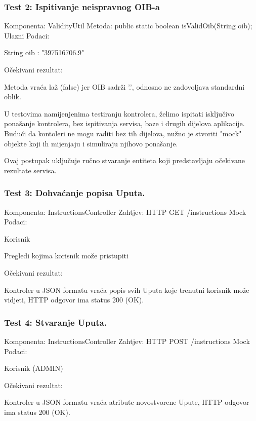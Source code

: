 			\subsubsection*{Test 2: Ispitivanje neispravnog OIB-a}
			Komponenta: ValidityUtil \newline
			Metoda: public static boolean isValidOib(String oib); \newline
			Ulazni Podaci: 
			\begin{packed_item}
				\item String oib : "397516706.9"
			\end{packed_item}
			Očekivani rezultat:
			\begin{packed_item}
				\item Metoda vraća laž (false) jer OIB sadrži '.', odnosno ne zadovoljava standardni oblik.
			\end{packed_item}

			U testovima namijenjenima testiranju kontrolera, želimo ispitati isključivo ponašanje kontrolera, bez ispitivanja servisa, baze i drugih dijelova aplikacije.
			Budući da kontoleri ne mogu raditi bez tih dijelova, nužno je stvoriti "mock" objekte koji ih mijenjaju i simuliraju njihovo ponašanje.

			Ovaj postupak uključuje ručno stvaranje entiteta koji predstavljaju očekivane rezultate servisa.

			\subsubsection*{Test 3: Dohvaćanje popisa Uputa.}
			Komponenta: InstructionsController \newline
			Zahtjev: HTTP GET /instructions \newline
			Mock Podaci:
			\begin{packed_item}
				\item Korisnik
				\item Pregledi kojima korisnik može pristupiti
			\end{packed_item}
			Očekivani rezultat:
			\begin{packed_item}
				\item Kontroler u JSON formatu vraća popis svih Uputa koje trenutni korisnik može vidjeti, HTTP odgovor ima status 200 (OK).
			\end{packed_item}
			
			\subsubsection*{Test 4: Stvaranje Uputa.}
			Komponenta: InstructionsController \newline
			Zahtjev: HTTP POST /instructions \newline
			Mock Podaci:
			\begin{packed_item}
				\item Korisnik (ADMIN)
			\end{packed_item}
			Očekivani rezultat:
			\begin{packed_item}
				\item Kontroler u JSON formatu vraća atribute novostvorene Upute, HTTP odgovor ima status 200 (OK).
			\end{packed_item}

